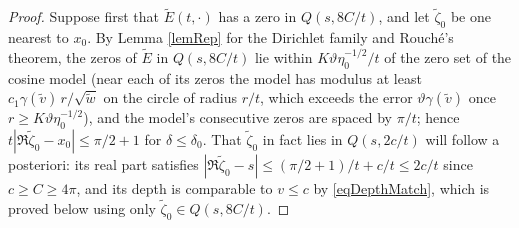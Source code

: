 \documentclass[11pt,twoside,reqno]{amsart}
\def\ti{\tilde}
\def\d{\delta}
\def\g{\gamma}
\theoremstyle{plain}
\numberwithin{equation}{section}
\begin{document}
\begin{proof}
Suppose first that $\ti E(t,\cdot)$ has a zero in $Q(s,8C/t)$, and let $\ti\zeta_0$ be one nearest to $x_0$. By Lemma \ref{lemRep} for the Dirichlet family and Rouch\'e's theorem, the zeros of $\ti E$ in $Q(s,8C/t)$ lie within $K\vartheta\eta_0^{-1/2}/t$ of the zero set of the cosine model (near each of its zeros the model has modulus at least $c_1\g(\ti v)\,r/\sqrt{\ti w}$ on the circle of radius $r/t$, which exceeds the error $\vartheta\g(\ti v)$ once $r\geq K\vartheta\eta_0^{-1/2}$), and the model's consecutive zeros are spaced by $\pi/t$; hence $t|\Re\ti\zeta_0-x_0|\leq\pi/2+1$ for $\d\leq\d_0$. That $\ti\zeta_0$ in fact lies in $Q(s,2c/t)$ will follow a posteriori: its real part satisfies $|\Re\ti\zeta_0-s|\leq(\pi/2+1)/t+c/t\leq2c/t$ since $c\geq C\geq4\pi$, and its depth is comparable to $v\leq c$ by \eqref{eqDepthMatch}, which is proved below using only $\ti\zeta_0\in Q(s,8C/t)$.


\end{proof}
\end{document}
